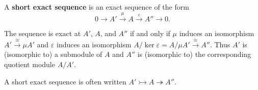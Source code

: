 A \textbf{short exact sequence} is an exact sequence of the form
$$0 \to A' \xrightarrow{\mu} A \xrightarrow{\varepsilon} A'' \to 0.$$

The sequence is exact at $A'$, $A$, and $A''$ if and only if $\mu$ induces an isomorphism $A' \xrightarrow{\cong} \mu A'$ and $\varepsilon$ induces an isomorphism $A / \ker \varepsilon = A / \mu A' \xrightarrow{\cong} A''$. Thus $A'$ is (isomorphic to) a submodule of $A$ and $A''$ is (isomorphic to) the corresponding quotient module $A / A'$.

A short exact sequence is often written $A' \rightarrowtail A \twoheadrightarrow A''$.

